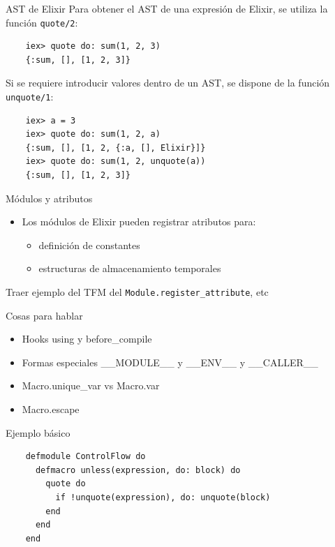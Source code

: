 \documentclass[14pt,aspectratio=169]{beamer}
\begin{document}
\begin{frame}[fragile]{AST de Elixir}
  Para obtener el AST de una expresión de Elixir, se utiliza la función
  \texttt{quote/2}:
  \footnotesize  \begin{verbatim}
    iex> quote do: sum(1, 2, 3)
    {:sum, [], [1, 2, 3]}
  \end{verbatim}
  \normalsize Si se requiere introducir valores dentro de un AST, se dispone de la función
  \texttt{unquote/1}:
  \footnotesize \begin{verbatim}
    iex> a = 3
    iex> quote do: sum(1, 2, a)
    {:sum, [], [1, 2, {:a, [], Elixir}]}
    iex> quote do: sum(1, 2, unquote(a))
    {:sum, [], [1, 2, 3]}
  \end{verbatim}
\end{frame}

\begin{frame}{Módulos y atributos}
  \begin{itemize}
    \item Los módulos de Elixir pueden registrar atributos para:
    \begin{itemize}
      \item definición de constantes
      \item estructuras de almacenamiento temporales
    \end{itemize}
  \end{itemize}
\end{frame}

\begin{frame}
  Traer ejemplo del TFM del \texttt{Module.register\_attribute}, etc
\end{frame}

\begin{frame}{Cosas para hablar}
  \begin{itemize}
    \item Hooks using y before\_compile
    \item Formas especiales \_\_MODULE\_\_ y \_\_ENV\_\_ y \_\_CALLER\_\_
    \item Macro.unique\_var vs Macro.var
    \item Macro.escape
  \end{itemize}

\end{frame}

\begin{frame}[fragile]{Ejemplo básico}
  \begin{verbatim}
    defmodule ControlFlow do
      defmacro unless(expression, do: block) do
        quote do
          if !unquote(expression), do: unquote(block)
        end
      end
    end
  \end{verbatim}
\end{frame}
\end{document}

